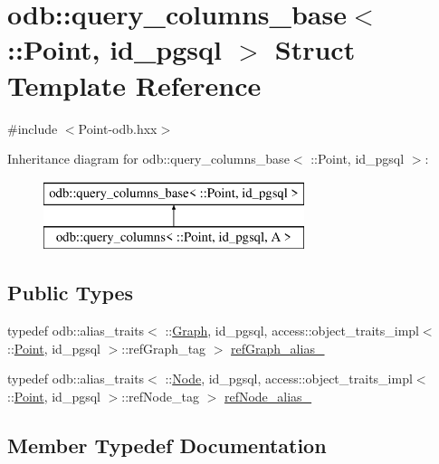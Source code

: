 \hypertarget{structodb_1_1query__columns__base_3_01_1_1_point_00_01id__pgsql_01_4}{}\section{odb\+:\+:query\+\_\+columns\+\_\+base$<$ \+:\+:Point, id\+\_\+pgsql $>$ Struct Template Reference}
\label{structodb_1_1query__columns__base_3_01_1_1_point_00_01id__pgsql_01_4}


{\ttfamily \#include $<$Point-\/odb.\+hxx$>$}

Inheritance diagram for odb\+:\+:query\+\_\+columns\+\_\+base$<$ \+:\+:Point, id\+\_\+pgsql $>$\+:\begin{figure}[H]
\begin{center}
\leavevmode
\includegraphics[height=2.000000cm]{d1/d70/structodb_1_1query__columns__base_3_01_1_1_point_00_01id__pgsql_01_4}
\end{center}
\end{figure}
\subsection*{Public Types}
\begin{DoxyCompactItemize}
\item 
typedef odb\+::alias\+\_\+traits$<$ \+::\hyperlink{class_graph}{Graph}, id\+\_\+pgsql, access\+::object\+\_\+traits\+\_\+impl$<$ \+::\hyperlink{class_point}{Point}, id\+\_\+pgsql $>$\+::ref\+Graph\+\_\+tag $>$ \hyperlink{structodb_1_1query__columns__base_3_01_1_1_point_00_01id__pgsql_01_4_a19b02b8f057af3570dba889095b17ccd}{ref\+Graph\+\_\+alias\+\_\+}
\item 
typedef odb\+::alias\+\_\+traits$<$ \+::\hyperlink{class_node}{Node}, id\+\_\+pgsql, access\+::object\+\_\+traits\+\_\+impl$<$ \+::\hyperlink{class_point}{Point}, id\+\_\+pgsql $>$\+::ref\+Node\+\_\+tag $>$ \hyperlink{structodb_1_1query__columns__base_3_01_1_1_point_00_01id__pgsql_01_4_aa47a7e27f3d9c6033aaa352be5a32b02}{ref\+Node\+\_\+alias\+\_\+}
\end{DoxyCompactItemize}


\subsection{Member Typedef Documentation}
\hypertarget{structodb_1_1query__columns__base_3_01_1_1_point_00_01id__pgsql_01_4_a19b02b8f057af3570dba889095b17ccd}{}
